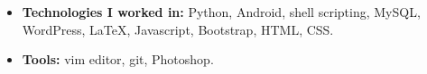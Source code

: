 \documentclass[10.1pt,a4paper,sans]{moderncv}        %
\begin{document}
\vspace{3pt}
 
\begin{itemize}

\item \textbf{Technologies I worked in:} Python, Android, shell scripting, MySQL, WordPress, LaTeX, Javascript, Bootstrap, HTML, CSS.

\item \textbf{Tools:} vim editor, git, Photoshop.
\end{itemize}

\nocite{*}



\end{document}
